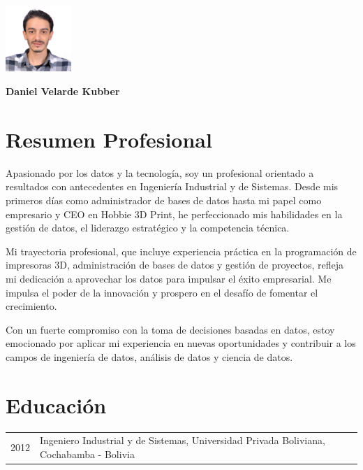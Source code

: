 \documentclass[a4paper,10pt]{article}
\begin{document}
\begin{minipage}[t]{0.7\textwidth}
\end{minipage}
\hfill
\begin{minipage}[t]{0.3\textwidth}
  \includegraphics[width=2.5cm]{photocv.jpeg}
\end{minipage}

\begin{center}
\textbf{\LARGE Daniel Velarde Kubber}
\end{center}



\section*{Resumen Profesional}
Apasionado por los datos y la tecnología, soy un profesional orientado a resultados con antecedentes en Ingeniería Industrial y de Sistemas. Desde mis primeros días como administrador de bases de datos hasta mi papel como empresario y CEO en Hobbie 3D Print, he perfeccionado mis habilidades en la gestión de datos, el liderazgo estratégico y la competencia técnica.

Mi trayectoria profesional, que incluye experiencia práctica en la programación de impresoras 3D, administración de bases de datos y gestión de proyectos, refleja mi dedicación a aprovechar los datos para impulsar el éxito empresarial. Me impulsa el poder de la innovación y prospero en el desafío de fomentar el crecimiento.

Con un fuerte compromiso con la toma de decisiones basadas en datos, estoy emocionado por aplicar mi experiencia en nuevas oportunidades y contribuir a los campos de ingeniería de datos, análisis de datos y ciencia de datos.

\section*{Educación}
\begin{tabular}{p{3cm}p{12cm}}
    2012 & Ingeniero Industrial y de Sistemas, Universidad Privada Boliviana, Cochabamba - Bolivia \\
\end{tabular}
\end{document}
